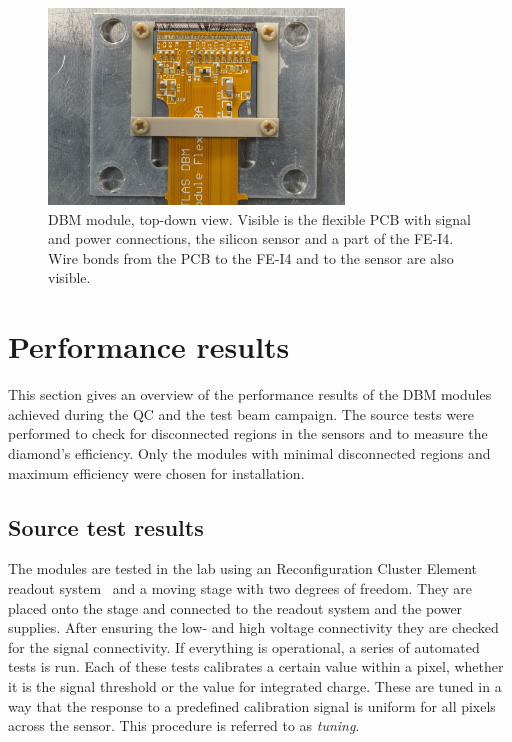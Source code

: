\begin{figure}[!t]
\centering
\includegraphics[width=0.7\textwidth]{04_charge_monitoring/pics/mod1}
\caption{DBM module, top-down view. Visible is the flexible PCB with signal and power connections, the silicon sensor and a part of the FE-I4. Wire bonds from the PCB to the FE-I4 and to the sensor are also visible.}
\label{fig:completedmod}
\end{figure}



\section{Performance results}
\label{sec:perfresults}
This section gives an overview of the performance results of the DBM modules achieved during the QC and the test beam campaign. The source tests were performed to check for disconnected regions in the sensors and to measure the diamond's efficiency. Only the modules with minimal disconnected regions and maximum efficiency were chosen for installation. 


\subsection{Source test results}
The modules are tested in the lab using an Reconfiguration Cluster Element readout system~\cite{Claus:2021543} and a moving stage with two degrees of freedom. They are placed onto the stage and connected to the readout system and the power supplies. After ensuring the low- and high voltage connectivity they are checked for the signal connectivity. If everything is operational, a series of automated tests is run. Each of these tests calibrates a certain value within a pixel, whether it is the signal threshold or the value for integrated charge. These are tuned in a way that the response to a predefined calibration signal is uniform for all pixels across the sensor. This procedure is referred to as \emph{tuning}. 

